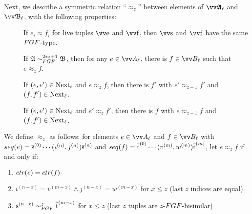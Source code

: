 Next, we describe a symmetric relation ``$\approx_{z}$'' between elements of $\unravel{A}_{\ell}$ and $\unravel{B}_{\ell}$, with the following properties:
\begin{description}
  \item[] If $e_{i} \approx f_{i}$ for live tuples $\elemtuptuplee$ and $\elemtuptuplef$, then $\elemtuptuples$ and $\elemtuptuplef$ have the same $\FGF$-type.
  \item[] If $\str{A} \bisimto_{\FGF}^{2*z + 1} \str{B}$, then for any $e \in \unraveldom{A}_{\ell}$, there is $f \in \unraveldom{B}_{\ell}$ such that $e \approx_{z} f$.
  \item[] If $(e, e') \in \mathrm{Next}_{\ell}$ and $e \approx_{z} f$, then there is $f'$ with $e' \approx_{z-1} f'$ and $(f, f') \in \mathrm{Next}_{\ell}$.
  \item[] If $(e, e') \in \mathrm{Next}_{\ell}$ and $e' \approx_{z} f'$, then there is $f$ with $e \approx_{z-1} f$ and $(f, f') \in \mathrm{Next}_{\ell}$.
\end{description}
We define $\approx_{z}$ as follows: for elements $e \in \unraveldom{A}_{\ell}$ and $f \in \unraveldom{B}_{\ell}$ with $\seq{e} = \elemtuples^{(0)}\cdots(i^{(n)}, j^{(n)})\elemtuples^{(n)}$ and $\seq{f} = \elemtuplet^{(0)}\cdots(v^{(m)}, w^{(m)})\elemtuplet^{(m)}$, let $e \approx_{z} f$ if and only if:
\begin{enumerate}
  \item $\ctr{e} = \ctr{f}$
  \item $i^{(n-x)} = v^{(m-x)} \wedge j^{(n-x)} = w^{(m-x)}$ for $x \le z$ (last $z$ indices are equal)
  \item $\elemtuples^{(n-x)} \bisimto_{\FGF}^{z} \elemtuplet^{(m-x)}$ for $x \le z$ (last $z$ tuples are $z$-$\FGF$-bisimilar)
\end{enumerate}
